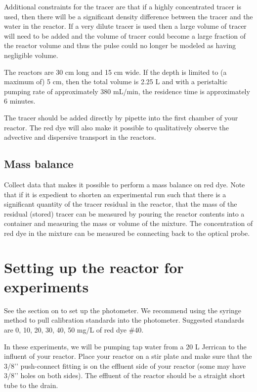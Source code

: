 \documentclass[letterpaper,10pt,english]{sphinxmanual}
\begin{document}
Additional constraints for the tracer are that if a highly concentrated tracer is used, then there will be a significant density difference between the tracer and the water in the reactor. If a very dilute tracer is used then a large volume of tracer will need to be added and the volume of tracer could become a large fraction of the reactor volume and thus the pulse could no longer be modeled as having negligible volume.

The reactors are 30 cm long and 15 cm wide. If the depth is limited to (a maximum of) 5 cm, then the total volume is 2.25 L and with a peristaltic pumping rate of approximately 380 mL/min, the residence time is approximately 6 minutes.

The tracer should be added directly by pipette into the first chamber of your reactor. The red dye will also make it possible to qualitatively observe the advective and dispersive transport in the reactors.


\subsection{Mass balance}
\label{\detokenize{Reactor_Characteristics/Reactor_Characteristics:mass-balance}}
Collect data that makes it possible to perform a mass balance on red dye. Note that if it is expedient to shorten an experimental run such that there is a significant quantity of the tracer residual in the reactor, that the mass of the residual (stored) tracer can be measured by pouring the reactor contents into a container and measuring the mass or volume of the mixture. The concentration of red dye in the mixture can be measured be connecting back to the optical probe.


\section{Setting up the reactor for experiments}
\label{\detokenize{Reactor_Characteristics/Reactor_Characteristics:setting-up-the-reactor-for-experiments}}\label{\detokenize{Reactor_Characteristics/Reactor_Characteristics:heading-reactor-setting-up-the-reactor-for-experiments}}
See the section on {\hyperref[\detokenize{ProCoDA/ProCoDA:heading-procoda-photometer}]{}} to set up the photometer. We recommend using the syringe method to pull calibration standards into the photometer. Suggested standards are 0, 10, 20, 30, 40, 50 mg/L of red dye \#40.

In these experiments, we will be pumping tap water from a 20 L Jerrican to the influent of your reactor. Place your reactor on a stir plate and make sure that the 3/8’’ push-connect fitting is on the effluent side of your reactor (some may have 3/8’’ holes on both sides). The effluent of the reactor should be a straight short tube to the drain.
\end{document}
